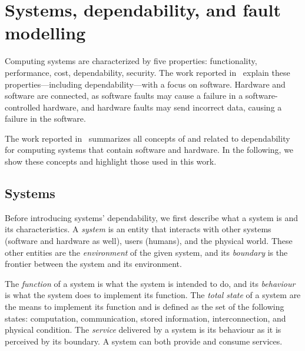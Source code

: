 \documentclass[12pt,openright,twoside,a4paper,oldfontcommands,english,brazil,final]{abntex2}
\theoremstyle{theo}
\begin{document}
\section{Systems, dependability, and fault modelling}
\label{sec:dependability}

\begin{sloppypar}
Computing systems are characterized by five properties: functionality, performance, cost, dependability, security.
The work reported in~\cite[p. 289--302]{Sommerville2011} explain these properties---including dependability---with a focus on software.
Hardware and software are connected, as software faults may cause a failure in a software-controlled hardware, and hardware faults may send incorrect data, causing a failure in the software.
\end{sloppypar}

The work reported in~\cite{ALR+2004} summarizes all concepts of and related to dependability for computing systems that contain software and hardware.
In the following, we show these concepts and highlight those used in this work.

\subsection{Systems}

Before introducing systems' dependability, we first describe what a system is and its characteristics.
A \emph{system} is an entity that interacts with other systems (software and hardware as well), users (humans), and the physical world.
These other entities are the \emph{environment} of the given system, and its \emph{boundary} is the frontier between the system and its environment.

The \emph{function} of a system is what the system is intended to do, and its \emph{behaviour} is what the system does to implement its function. 
The \emph{total state} of a system are the means to implement its function and is defined as the set of the following states: computation, communication, stored information, interconnection, and physical condition.
The \emph{service} delivered by a system is its behaviour as it is perceived by its boundary.
A system can both provide and consume services.
\end{document}
